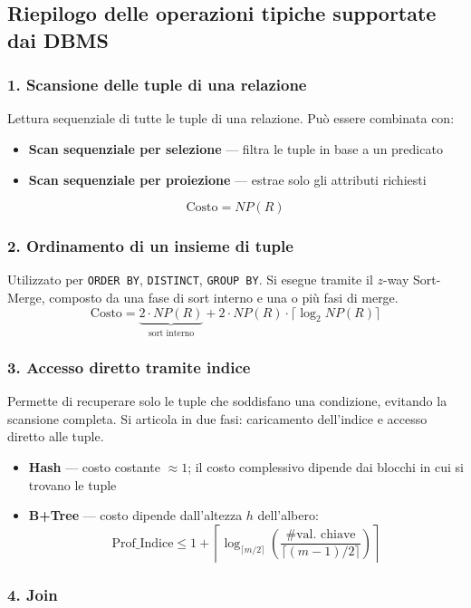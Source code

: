 \subsection{Riepilogo delle operazioni tipiche supportate dai DBMS}

\subsubsection*{1. Scansione delle tuple di una relazione}
Lettura sequenziale di tutte le tuple di una relazione. Può essere combinata con:
\begin{itemize}
	\item \textbf{Scan sequenziale per selezione} — filtra le tuple in base a un predicato
	\item \textbf{Scan sequenziale per proiezione} — estrae solo gli attributi richiesti
\end{itemize}
\[
\text{Costo} = NP(R)
\]

\subsubsection*{2. Ordinamento di un insieme di tuple}
Utilizzato per \texttt{ORDER BY}, \texttt{DISTINCT}, \texttt{GROUP BY}. Si esegue tramite il $z$-way Sort-Merge, composto da una fase di sort interno e una o più fasi di merge.
\[
\text{Costo} = \underbrace{2 \cdot NP(R)}_{\text{sort interno}} + 2 \cdot NP(R) \cdot \lceil \log_2 NP(R) \rceil
\]

\subsubsection*{3. Accesso diretto tramite indice}
Permette di recuperare solo le tuple che soddisfano una condizione, evitando la scansione completa. Si articola in due fasi: caricamento dell'indice e accesso diretto alle tuple.
\begin{itemize}
	\item \textbf{Hash} — costo costante $\approx 1$; il costo complessivo dipende dai blocchi in cui si trovano le tuple
	\item \textbf{B+Tree} — costo dipende dall'altezza $h$ dell'albero:
	\[
	\text{Prof\_Indice} \leq 1 + \left\lceil \log_{\lceil m/2 \rceil}
	\left( \frac{\#\text{val. chiave}}{\lceil (m-1)/2 \rceil} \right) \right\rceil
	\]
\end{itemize}

\subsubsection*{4. Join}

